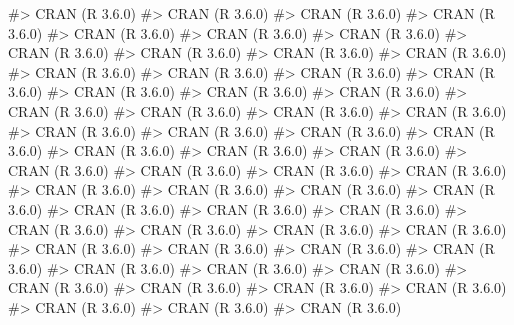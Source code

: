 \documentclass[
]{jss}
\begin{document}
\begin{CodeChunk}
\begin{CodeInput}
\begin{CodeChunk}
\begin{CodeOutput}
#>  CRAN (R 3.6.0)                          
#>  CRAN (R 3.6.0)                          
#>  CRAN (R 3.6.0)                          
#>  CRAN (R 3.6.0)                          
#>  CRAN (R 3.6.0)                          
#>  CRAN (R 3.6.0)                          
#>  CRAN (R 3.6.0)                          
#>  CRAN (R 3.6.0)                          
#>  CRAN (R 3.6.0)                          
#>  CRAN (R 3.6.0)                          
#>  CRAN (R 3.6.0)                          
#>  CRAN (R 3.6.0)                          
#>  CRAN (R 3.6.0)                          
#>  CRAN (R 3.6.0)                          
#>  CRAN (R 3.6.0)                          
#>  CRAN (R 3.6.0)                          
#>  CRAN (R 3.6.0)                          
#>  CRAN (R 3.6.0)                          
#>  CRAN (R 3.6.0)                          
#>  CRAN (R 3.6.0)                          
#>  CRAN (R 3.6.0)                          
#>  CRAN (R 3.6.0)                          
#>  CRAN (R 3.6.0)                          
#>  CRAN (R 3.6.0)                          
#>  CRAN (R 3.6.0)                          
#>  CRAN (R 3.6.0)                          
#>  CRAN (R 3.6.0)                          
#>  CRAN (R 3.6.0)                          
#>  CRAN (R 3.6.0)                          
#>  CRAN (R 3.6.0)                          
#>  CRAN (R 3.6.0)                          
#>  CRAN (R 3.6.0)                          
#>  CRAN (R 3.6.0)                          
#>  CRAN (R 3.6.0)                          
#>  CRAN (R 3.6.0)                          
#>  CRAN (R 3.6.0)                          
#>  CRAN (R 3.6.0)                          
#>  CRAN (R 3.6.0)                          
#>  CRAN (R 3.6.0)                          
#>  CRAN (R 3.6.0)                          
#>  CRAN (R 3.6.0)                          
#>  CRAN (R 3.6.0)                          
#>  CRAN (R 3.6.0)                          
#>  CRAN (R 3.6.0)                          
#>  CRAN (R 3.6.0)                          
#>  CRAN (R 3.6.0)                          
#>  CRAN (R 3.6.0)                          
#>  CRAN (R 3.6.0)                          
#>  CRAN (R 3.6.0)                          
#>  CRAN (R 3.6.0)                          
#>  CRAN (R 3.6.0)                          
#>  CRAN (R 3.6.0)                          
#>  CRAN (R 3.6.0)                          
#>  CRAN (R 3.6.0)                          
#>  CRAN (R 3.6.0)                          
#>  CRAN (R 3.6.0)                          
#>  CRAN (R 3.6.0)                          
#>  CRAN (R 3.6.0)                          

\end{CodeOutput}
\end{CodeChunk}
\end{CodeInput}
\end{CodeChunk}
\end{document}
